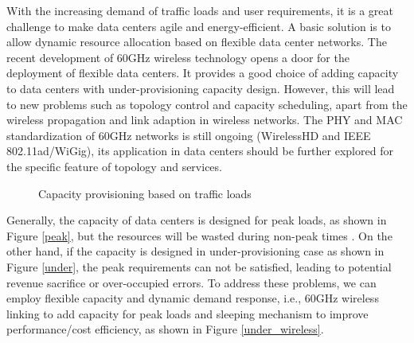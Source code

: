 \documentclass[journal,onecolumn,11pt]{IEEEtran}
\begin{document}
With the increasing demand of traffic loads and user requirements, it is a great challenge to make data centers agile and energy-efficient. A basic solution is to allow dynamic resource allocation based on flexible data center networks. The recent development of 60GHz wireless technology opens a door for the deployment of flexible data centers. It provides a good choice of adding capacity to data centers with under-provisioning capacity design. However, this will lead to new problems such as topology control and capacity scheduling, apart from the wireless propagation and link adaption in wireless networks. The PHY and MAC standardization of 60GHz networks is still ongoing (WirelessHD and IEEE 802.11ad/WiGig), its application in data centers should be further explored for the specific feature of topology and services.

\begin{figure}[!htp]
\centerline{
}
\caption{Capacity provisioning based on traffic loads}
\label{provisioning}
\end{figure}

Generally, the capacity of data centers is designed for peak loads, as shown in Figure \ref{peak}, but the resources will be wasted during non-peak times \cite{Armbrust:2010:VCC:1721654.1721672}. On the other hand, if the capacity is designed in under-provisioning case as shown in Figure \ref{under}, the peak requirements can not be satisfied, leading to potential revenue sacrifice or over-occupied errors. To address these problems, we can employ flexible capacity and dynamic demand response, i.e., 60GHz wireless linking to add capacity for peak loads and sleeping mechanism to improve performance/cost efficiency, as shown in Figure \ref{under_wireless}.
\end{document}
